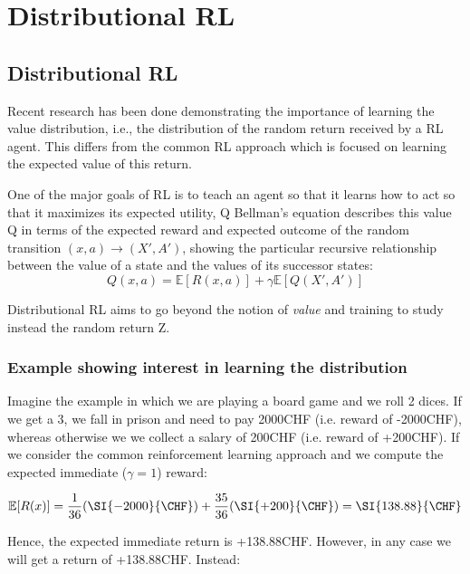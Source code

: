
\chapter{Distributional RL}
\label{chapter:distr_rl}


\section{Distributional RL}

Recent research has been done demonstrating the importance of learning the value
distribution,
i.e., the distribution of the random return received by a RL agent.
This differs from the common RL approach which is focused on learning the expected value
 of this return.

One of the major goals of RL is to teach an agent so that it learns how to act so that it
maximizes its expected utility, Q \cite{Sutton1998}
Bellman's equation describes this value Q in terms of the expected reward and expected
outcome of the 
random transition $(x,a) \to (X',A')$, showing the
particular recursive relationship between the value of a state and the values of its
successor states:
\begin{equation}
    Q(x,a) = \mathbb E[R(x,a)] + \gamma \mathbb E[Q(X',A')] \label{eq:bellman}
\end{equation}

Distributional RL aims to go beyond the notion of \textit{value} and training to study
instead the random 
return Z.

\subsection{Example showing interest in learning the distribution}

Imagine the example in which we are playing a board game and we roll 2 dices.
If we get a 3, we fall in prison and need to pay 2000CHF (i.e. reward of -2000CHF), whereas
 otherwise we 
we collect a salary of 200CHF (i.e. reward of +200CHF).
If we consider the common reinforcement learning approach and we compute the expected
immediate ($\gamma = 1$)
reward: 

\begin{equation}
    \mathbb E[R(x)]= \frac{1}{36} (\SI{-2000}{\CHF}) + \frac{35}{36} (\SI{+200}{\CHF}) = \SI{138.88}{\CHF} 
\end{equation}

Hence, the expected immediate return is +138.88CHF. However, in any case we will get a
return of +138.88CHF.
Instead:

